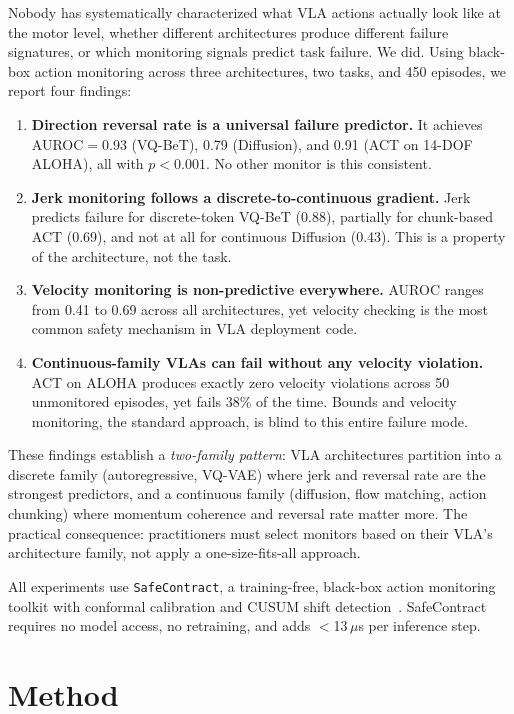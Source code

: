 \documentclass[conference]{IEEEtran}
\begin{document}
Nobody has systematically characterized what VLA actions actually look like at the motor level, whether different architectures produce different failure signatures, or which monitoring signals predict task failure.
We did.
Using black-box action monitoring across three architectures, two tasks, and 450 episodes, we report four findings:

\begin{enumerate}
    \item \textbf{Direction reversal rate is a universal failure predictor.} It achieves AUROC${=}$0.93 (VQ-BeT), 0.79 (Diffusion), and 0.91 (ACT on 14-DOF ALOHA), all with $p < 0.001$. No other monitor is this consistent.
    \item \textbf{Jerk monitoring follows a discrete-to-continuous gradient.} Jerk predicts failure for discrete-token VQ-BeT (0.88), partially for chunk-based ACT (0.69), and not at all for continuous Diffusion (0.43). This is a property of the architecture, not the task.
    \item \textbf{Velocity monitoring is non-predictive everywhere.} AUROC ranges from 0.41 to 0.69 across all architectures, yet velocity checking is the most common safety mechanism in VLA deployment code.
    \item \textbf{Continuous-family VLAs can fail without any velocity violation.} ACT on ALOHA produces exactly zero velocity violations across 50 unmonitored episodes, yet fails 38\% of the time. Bounds and velocity monitoring, the standard approach, is blind to this entire failure mode.
\end{enumerate}

These findings establish a \emph{two-family pattern}: VLA architectures partition into a discrete family (autoregressive, VQ-VAE) where jerk and reversal rate are the strongest predictors, and a continuous family (diffusion, flow matching, action chunking) where momentum coherence and reversal rate matter more.
The practical consequence: practitioners must select monitors based on their VLA's architecture family, not apply a one-size-fits-all approach.

All experiments use \texttt{SafeContract}, a training-free, black-box action monitoring toolkit with conformal calibration and CUSUM shift detection~\cite{vovk2005,page1954}.
SafeContract requires no model access, no retraining, and adds $<$13\,$\mu$s per inference step.

\section{Method}
\label{sec:method}
\end{document}
